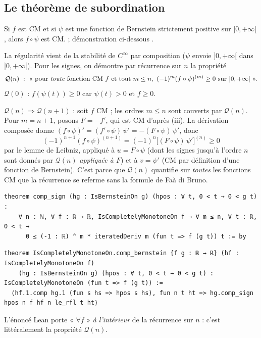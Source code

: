 \subsection{Le théorème de subordination}
\begin{theorem}[subordination]\label{ch2:thm:subord}
Si $f$ est CM et si $\psi$ est une fonction de Bernstein strictement positive sur $]0,+\infty[$, alors $f\circ\psi$ est
CM. \tierA{} ; démonstration ci-dessous \tierC.
\end{theorem}
\begin{humanproof}
La régularité vient de la stabilité de $C^\infty$ par composition ($\psi$ envoie $]0,+\infty[$ dans $]0,+\infty[$).
Pour les signes, on démontre par récurrence sur $n$ la propriété
\[\mathcal Q(n)\ :\ \text{« pour \emph{toute} fonction CM } f\text{ et tout } m\le n,\ (-1)^m(f\circ\psi)^{(m)}\ge0\text{ sur }]0,+\infty[\text{ ».}\]
$\mathcal Q(0)$ : $f(\psi(t))\ge0$ car $\psi(t)>0$ et $f\ge0$.

$\mathcal Q(n)\Rightarrow\mathcal Q(n+1)$ : soit $f$ CM ; les ordres $m\le n$ sont couverts par $\mathcal Q(n)$. Pour
$m=n+1$, posons $F=-f'$, qui est CM d'après (iii). La dérivation composée donne
$(f\circ\psi)'=(f'\circ\psi)\,\psi'=-(F\circ\psi)\,\psi'$, donc
\[(-1)^{n+1}(f\circ\psi)^{(n+1)}=(-1)^n\bigl[(F\circ\psi)\,\psi'\bigr]^{(n)}\ge0\]
par le lemme de Leibniz, appliqué à $u=F\circ\psi$ (dont les signes jusqu'à l'ordre $n$ sont donnés par $\mathcal Q(n)$
\emph{appliquée à $F$}) et à $v=\psi'$ (CM par définition d'une fonction de Bernstein). C'est parce que $\mathcal Q(n)$
quantifie sur \emph{toutes} les fonctions CM que la récurrence se referme sans la formule de Faà di Bruno.
\end{humanproof}
\begin{leanbox}
\begin{lstlisting}[style=chdeux]
theorem comp_sign (hg : IsBernsteinOn g) (hpos : ∀ t, 0 < t → 0 < g t) :
    ∀ n : ℕ, ∀ f : ℝ → ℝ, IsCompletelyMonotoneOn f → ∀ m ≤ n, ∀ t : ℝ, 0 < t →
      0 ≤ (-1 : ℝ) ^ m * iteratedDeriv m (fun t => f (g t)) t := by
\end{lstlisting}
\begin{lstlisting}[style=chdeux]
theorem IsCompletelyMonotoneOn.comp_bernstein {f g : ℝ → ℝ} (hf : IsCompletelyMonotoneOn f)
    (hg : IsBernsteinOn g) (hpos : ∀ t, 0 < t → 0 < g t) : IsCompletelyMonotoneOn (fun t => f (g t)) :=
  ⟨hf.1.comp hg.1 (fun s hs => hpos s hs), fun n t ht => hg.comp_sign hpos n f hf n le_rfl t ht⟩
\end{lstlisting}
\end{leanbox}
\noindent L'énoncé Lean  porte « $\forall f$ » \emph{à l'intérieur} de la récurrence sur $n$ : c'est
littéralement la propriété $\mathcal Q(n)$.

